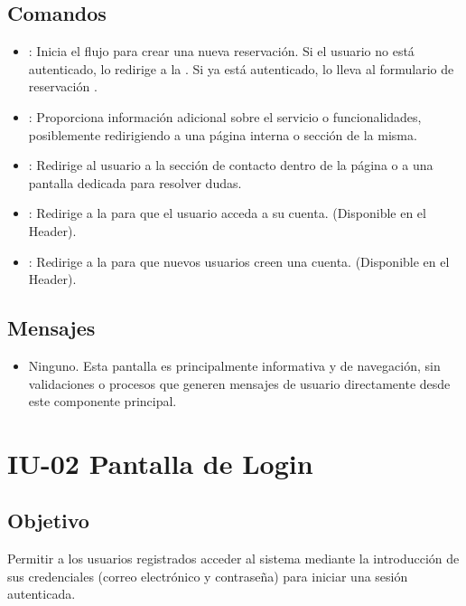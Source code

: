 \subsection{Comandos}
\begin{itemize}
    \item {}: Inicia el flujo para crear una nueva reservación. Si el usuario no está autenticado, lo redirige a la . Si ya está autenticado, lo lleva al formulario de reservación .
    \item {}: Proporciona información adicional sobre el servicio o funcionalidades, posiblemente redirigiendo a una página interna o sección de la misma.
    \item {}: Redirige al usuario a la sección de contacto dentro de la página o a una pantalla dedicada para resolver dudas.
    \item {}: Redirige a la  para que el usuario acceda a su cuenta. (Disponible en el Header).
    \item {}: Redirige a la  para que nuevos usuarios creen una cuenta. (Disponible en el Header).
\end{itemize}

\subsection{Mensajes}
\begin{itemize}
    \item Ninguno. Esta pantalla es principalmente informativa y de navegación, sin validaciones o procesos que generen mensajes de usuario directamente desde este componente principal.
\end{itemize}


\section{IU-02 Pantalla de Login}

\subsection{Objetivo}
    Permitir a los usuarios registrados acceder al sistema mediante la introducción de sus credenciales (correo electrónico y contraseña) para iniciar una sesión autenticada.

